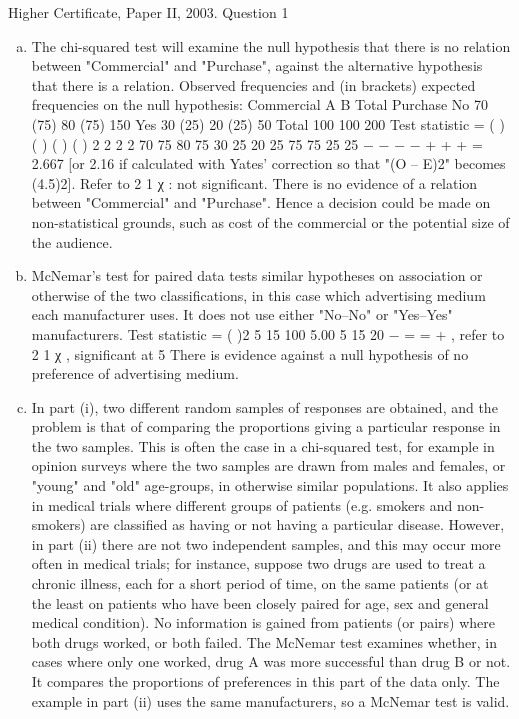 \documentclass[a4paper,12pt]{article}
\begin{document}
Higher Certificate, Paper II, 2003. Question 1
\begin{enumerate}[(a)]
\item The chi-squared test will examine the null hypothesis that there is no relation
between "Commercial" and "Purchase", against the alternative hypothesis that
there is a relation.
Observed frequencies and (in brackets) expected frequencies on the null
hypothesis:
Commercial
A B Total
Purchase No 70 (75) 80 (75) 150 Yes 30 (25) 20 (25) 50
Total 100 100 200
Test statistic = ( ) ( ) ( ) ( ) 2 2 2 2 70 75 80 75 30 25 20 25
75 75 25 25
− − − −
+ + + = 2.667
[or 2.16 if calculated with Yates' correction so that "(O – E)2" becomes (4.5)2].
Refer to 2
1 χ : not significant. There is no evidence of a relation between
"Commercial" and "Purchase".
Hence a decision could be made on non-statistical grounds, such as cost of the
commercial or the potential size of the audience.
\item  McNemar's test for paired data tests similar hypotheses on association or
otherwise of the two classifications, in this case which advertising medium
each manufacturer uses. It does not use either "No–No" or "Yes–Yes"
manufacturers.
Test statistic = ( )2 5 15 100 5.00
5 15 20
−
= =
+
, refer to 2
1 χ , significant at 5%
There is evidence against a null hypothesis of no preference of advertising
medium.
\item In part (i), two different random samples of responses are obtained, and the
problem is that of comparing the proportions giving a particular response in
the two samples. This is often the case in a chi-squared test, for example in
opinion surveys where the two samples are drawn from males and females, or
"young" and "old" age-groups, in otherwise similar populations. It also
applies in medical trials where different groups of patients (e.g. smokers and
non-smokers) are classified as having or not having a particular disease.
However, in part (ii) there are not two independent samples, and this may
occur more often in medical trials; for instance, suppose two drugs are used to
treat a chronic illness, each for a short period of time, on the same patients (or
at the least on patients who have been closely paired for age, sex and general
medical condition). No information is gained from patients (or pairs) where
both drugs worked, or both failed. The McNemar test examines whether, in
cases where only one worked, drug A was more successful than drug B or not.
It compares the proportions of preferences in this part of the data only. The
example in part (ii) uses the same manufacturers, so a McNemar test is valid.
\end{enumerate}
\end{document}

